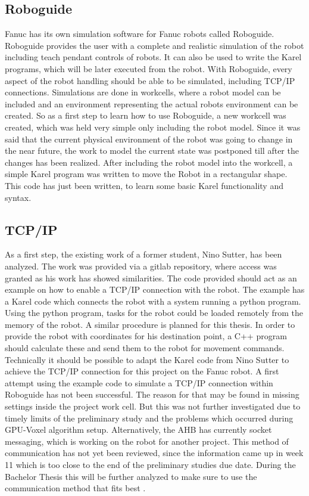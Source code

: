 \subsection{Roboguide}
Fanuc has its own simulation software for Fanuc robots called Roboguide. Roboguide provides the user with a complete and realistic simulation of the robot including teach pendant controls of robots. It can also be used to write the Karel programs, which will be later executed from the robot. With Roboguide, every aspect of the robot handling should be able to be simulated, including TCP/IP connections. Simulations are done in workcells, where a robot model can be included and an environment representing the actual robots environment can be created. So as a first step to learn how to use Roboguide, a new workcell was created, which was held very simple only including the robot model. Since it was said that the current physical environment of the robot was going to change in the near future, the work to model the current state was postponed till after the changes has been realized. After including the robot model into the workcell, a simple Karel program was written to move the Robot in a rectangular shape. This code has just been written, to learn some basic Karel functionality and syntax.

\subsection{TCP/IP}

As a first step, the existing work of a former student, Nino Sutter, has been analyzed. The work was provided via a gitlab repository, where access was granted as his work has showed similarities. The code provided should act as an example on how to enable a TCP/IP connection with the robot. The example has a Karel code which connects the robot with a system running a python program. Using the python program, tasks for the robot could be loaded remotely from the memory of the robot. A similar procedure is planned for this thesis. In order to provide the robot with coordinates for his destination point, a C++ program should calculate these and send them to the robot for movement commands. Technically it should be possible to adapt the Karel code from Nino Sutter to achieve the TCP/IP connection for this project on the Fanuc robot.
A first attempt using the example code to simulate a TCP/IP connection within Roboguide has not been successful. The reason for that may be found in missing settings inside the project work cell. But this was not further investigated due to timely limits of the preliminary study and the problems which occurred during GPU-Voxel algorithm setup.
Alternatively, the AHB has currently socket messaging, which is working on the robot for another project. This method of communication has not yet been reviewed, since the information came up in week 11 which is too close to the end of the preliminary studies due date. During the Bachelor Thesis this will be further analyzed to make sure to use the communication method that fits best \cite{motion}.


